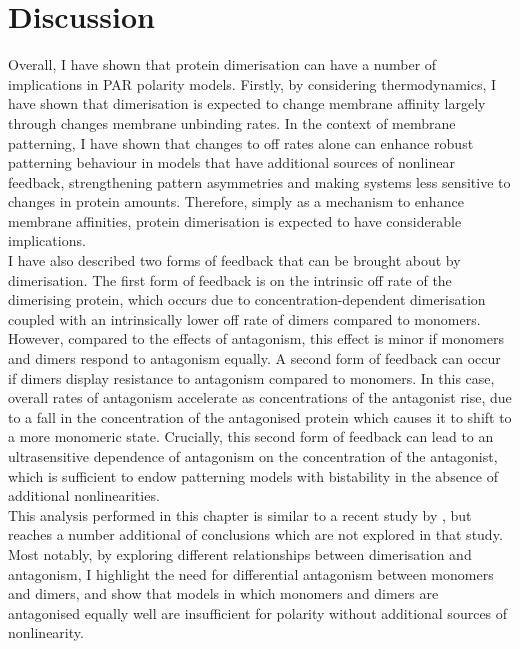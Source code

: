 \documentclass[12pt]{"report"}
\begin{document}
\clearpage
\section{Discussion}

Overall, I have shown that protein dimerisation can have a number of implications in PAR polarity models. Firstly, by considering thermodynamics, I have shown that dimerisation is expected to change membrane affinity largely through changes membrane unbinding rates. In the context of membrane patterning, I have shown that changes to off rates alone can enhance robust patterning behaviour in models that have additional sources of nonlinear feedback, strengthening pattern asymmetries and making systems less sensitive to changes in protein amounts. Therefore, simply as a mechanism to enhance membrane affinities, protein dimerisation is expected to have considerable implications.\\

I have also described two forms of feedback that can be brought about by dimerisation. The first form of feedback is on the intrinsic off rate of the dimerising protein, which occurs due to concentration-dependent dimerisation coupled with an intrinsically lower off rate of dimers compared to monomers. However, compared to the effects of antagonism, this effect is minor if monomers and dimers respond to antagonism equally. A second form of feedback can occur if dimers display resistance to antagonism compared to monomers. In this case, overall rates of antagonism accelerate as concentrations of the antagonist rise, due to a fall in the concentration of the antagonised protein which causes it to shift to a more monomeric state. Crucially, this second form of feedback can lead to an ultrasensitive dependence of antagonism on the concentration of the antagonist, which is sufficient to endow patterning models with bistability in the absence of additional nonlinearities. \\

This analysis performed in this chapter is similar to a recent study by \textcite{Lang2022}, but reaches a number additional of conclusions which are not explored in that study. Most notably, by exploring different relationships between dimerisation and antagonism, I highlight the need for differential antagonism between monomers and dimers, and show that models in which monomers and dimers are antagonised equally well are insufficient for polarity without additional sources of nonlinearity.\\
\end{document}

